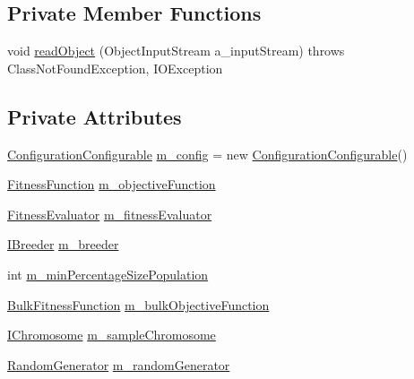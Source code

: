 \subsection*{Private Member Functions}
\begin{DoxyCompactItemize}
\item 
void \hyperlink{classorg_1_1jgap_1_1_configuration_aeba23ae3e7dde56f32ac1da2b516d8e4}{read\-Object} (Object\-Input\-Stream a\-\_\-input\-Stream)  throws Class\-Not\-Found\-Exception, I\-O\-Exception 
\end{DoxyCompactItemize}
\subsection*{Private Attributes}
\begin{DoxyCompactItemize}
\item 
\hyperlink{classorg_1_1jgap_1_1_configuration_1_1_configuration_configurable}{Configuration\-Configurable} \hyperlink{classorg_1_1jgap_1_1_configuration_a500818f896d3eb752a306d377d1c6652}{m\-\_\-config} = new \hyperlink{classorg_1_1jgap_1_1_configuration_1_1_configuration_configurable}{Configuration\-Configurable}()
\item 
\hyperlink{classorg_1_1jgap_1_1_fitness_function}{Fitness\-Function} \hyperlink{classorg_1_1jgap_1_1_configuration_ab2b072d0731e6f93e2fdb372f4ca03bf}{m\-\_\-objective\-Function}
\item 
\hyperlink{interfaceorg_1_1jgap_1_1_fitness_evaluator}{Fitness\-Evaluator} \hyperlink{classorg_1_1jgap_1_1_configuration_a4e997fe7d3a1557a2480602cfb53841c}{m\-\_\-fitness\-Evaluator}
\item 
\hyperlink{interfaceorg_1_1jgap_1_1_i_breeder}{I\-Breeder} \hyperlink{classorg_1_1jgap_1_1_configuration_ab64a248deded7963b22630652ef93f1d}{m\-\_\-breeder}
\item 
int \hyperlink{classorg_1_1jgap_1_1_configuration_a324033a53478579513a9fcf0c444472a}{m\-\_\-min\-Percentage\-Size\-Population}
\item 
\hyperlink{classorg_1_1jgap_1_1_bulk_fitness_function}{Bulk\-Fitness\-Function} \hyperlink{classorg_1_1jgap_1_1_configuration_ab58e4914e10b2c708a422f9dac2d6702}{m\-\_\-bulk\-Objective\-Function}
\item 
\hyperlink{interfaceorg_1_1jgap_1_1_i_chromosome}{I\-Chromosome} \hyperlink{classorg_1_1jgap_1_1_configuration_a47498d7f8e430011625b82986f28f33c}{m\-\_\-sample\-Chromosome}
\item 
\hyperlink{interfaceorg_1_1jgap_1_1_random_generator}{Random\-Generator} \hyperlink{classorg_1_1jgap_1_1_configuration_a2fefa16eac7e1026d6157a3cddd1d815}{m\-\_\-random\-Generator}

\end{DoxyCompactItemize}
